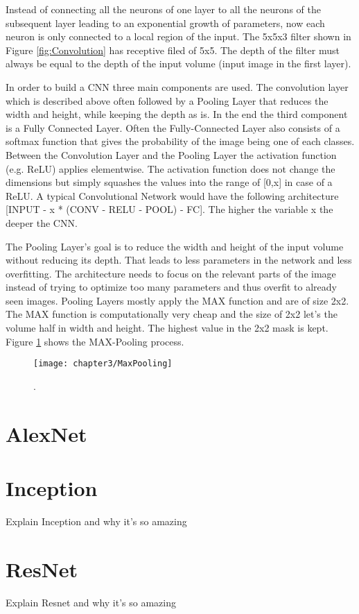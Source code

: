 Instead of connecting all the neurons of one layer to all the neurons of the subsequent layer leading to an exponential growth of parameters, now each neuron is only connected to a local region of the input. The 5x5x3 filter shown in Figure \ref{fig:Convolution} has receptive filed of 5x5. The depth of the filter must always be equal to the depth of the input volume (input image in the first layer).

In order to build a CNN three main components are used. The convolution layer which is described above often followed by a Pooling Layer that reduces the width and height, while keeping the depth as is. In the end the third component is a Fully Connected Layer. Often the Fully-Connected Layer also consists of a softmax function that gives the probability of the image being one of each classes. Between the Convolution Layer and the Pooling Layer the activation function (e.g. ReLU) applies elementwise. The activation function does not change the dimensions but simply squashes the values into the range of [0,x] in case of a ReLU. A typical Convolutional Network would have the following architecture [INPUT - x * (CONV - RELU - POOL) - FC]. The higher the variable x the deeper the CNN.

The Pooling Layer's goal is to reduce the width and height of the input volume without reducing its depth. That leads to less parameters in the network and less overfitting. The architecture needs to focus on the relevant parts of the image instead of trying to optimize too many parameters and thus overfit to already seen images. Pooling Layers mostly apply the MAX function and are of size 2x2. The MAX function is computationally very cheap and the size of 2x2 let's the volume half in width and height. The highest value in the 2x2 mask is kept. Figure \ref{fig:MaxPooling} shows the MAX-Pooling process.

\begin{figure}[H]
  \centering
  \caption{. \cite{cs231convnetworks}}
  \texttt{[image: chapter3/MaxPooling]}
  \label{fig:MaxPooling}
\end{figure}

\section{AlexNet}



\section{Inception}

Explain Inception and why it's so amazing

\section{ResNet}

Explain Resnet and why it's so amazing
